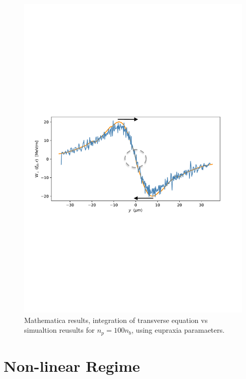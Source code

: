 \documentclass[%
onecolumn, notitlepage,
 amsmath,amssymb,
 aps,
]{article}
\begin{document}
\begin{figure}
\includegraphics[width=\textwidth]{transverse_theory_vs_sim4}
\caption{Mathematica results, integration of transverse equation vs simualtion reusults for $n_p=100n_b$, using eupraxia paramaeters. }
\end{figure}
\clearpage
\section*{Non-linear Regime} 
\end{document}

